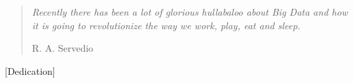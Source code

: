 
\cleartorecto %
\thispagestyle{plain} %

\blockquote[R. A. Servedio]{\em Recently there has been a lot of glorious hullabaloo about Big Data and how it is going to revolutionize the way we work, play, eat and sleep.}\bigskip


\begin{center}
  [Dedication]
\end{center}
